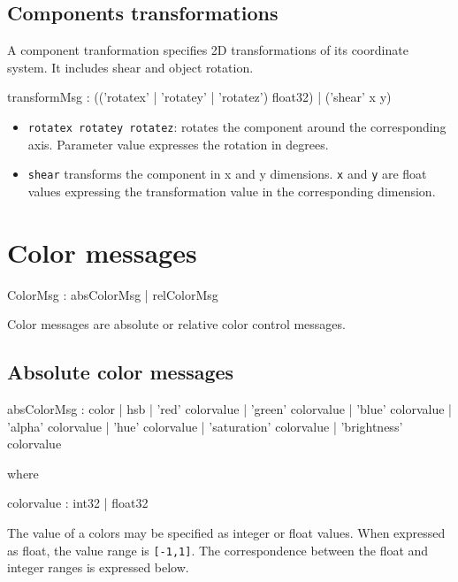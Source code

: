 \documentclass[a4paper,twoside]{report}
\newcommand{\sublevel}[1]	{\section{#1}}
\newcommand{\subsublevel}[1]	{\subsection{#1}}
\newcommand{\OSC}[1]		{\texttt{#1}}
\newcommand{\values}[1]	{\texttt{#1}}
\begin{document}
\subsublevel{Components transformations}
\label{transform}

A component tranformation specifies 2D transformations of its coordinate system. It includes shear and object rotation.

\begin{rail}
transformMsg :
			(('rotatex' | 'rotatey' | 'rotatez') float32)
		| 	('shear' x y)
\end{rail}

\begin{itemize}
\item \OSC{rotatex rotatey rotatez}: rotates the component around the corresponding axis. Parameter value expresses the rotation in degrees.
\item \OSC{shear} transforms the component in x and y dimensions. \OSC{x} and \OSC{y} are float values expressing the transformation value in the corresponding dimension.
\end{itemize}

\sublevel{Color messages}
\label{colormsg}


\begin{rail}
ColorMsg : 	absColorMsg 
			|	relColorMsg 
\end{rail}

Color messages are absolute or relative color control messages.

\subsublevel{Absolute color messages}

\begin{rail}
absColorMsg :    color
			| hsb
			| 'red' colorvalue
			| 'green' colorvalue
			| 'blue' colorvalue
			| 'alpha' colorvalue
			| 'hue' colorvalue
			| 'saturation' colorvalue
			| 'brightness' colorvalue
\end{rail}
where
\begin{rail}
colorvalue :    int32 | float32
\end{rail}

The value of a colors may be specified as integer or float values. When expressed as float, the value range is \values{[-1,1]}. The correspondence between the float and integer ranges is expressed below.
\end{document}
